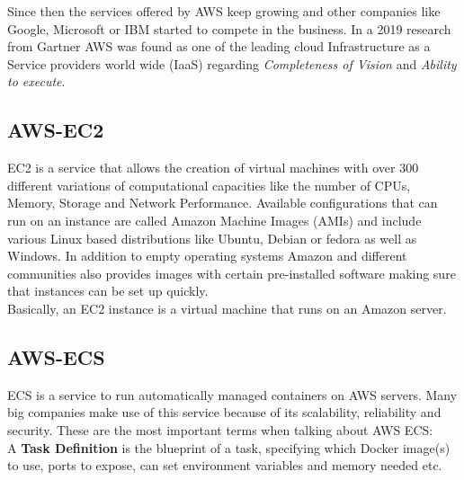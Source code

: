 Since then the services offered by AWS keep growing and other companies like Google, Microsoft or IBM started to compete in the business. In a 2019 research from Gartner AWS was found as one of the leading cloud Infrastructure as a Service providers world wide (IaaS) \cite{Gartner} 
regarding \emph{Completeness of Vision} and \emph{Ability to execute}. 

\subsection{AWS-EC2}
EC2 is a service that allows the creation of virtual machines with over 300 different variations of computational capacities like the number of CPUs, Memory, Storage and Network Performance. \cite{AwsEc2} 
Available configurations that can run on an instance are called Amazon Machine Images (AMIs) and include various Linux based distributions like Ubuntu, Debian or fedora as well as Windows. In addition to empty operating systems Amazon and different communities also provides images with certain pre-installed software making sure that instances can be set up quickly. \\
Basically, an EC2 instance is a virtual machine that runs on an Amazon server. \cite{Ec2VirtualMachine}


\subsection{AWS-ECS}
ECS is a service to run automatically managed containers on AWS servers. Many big companies make use of this service because of its scalability, reliability and security. \cite{AwsEc2}
These are the most important terms when talking about AWS ECS: \\

A \textbf{Task Definition} is the blueprint of a task, specifying which Docker image(s) to use, ports to expose, can set environment variables and memory needed etc. \cite{CodeCampEcs}

